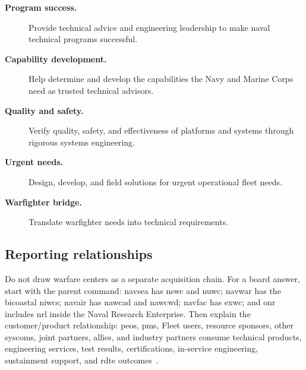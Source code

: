 \documentclass[../main.tex]{subfiles}
\begin{document}
\begin{description}
  \item[\textbf{Program success.}] Provide technical advice and engineering leadership to make naval technical programs successful.
  \item[\textbf{Capability development.}] Help determine and develop the capabilities the Navy and Marine Corps need as trusted technical advisors.
  \item[\textbf{Quality and safety.}] Verify quality, safety, and effectiveness of platforms and systems through rigorous systems engineering.
  \item[\textbf{Urgent needs.}] Design, develop, and field solutions for urgent operational fleet needs.
  \item[\textbf{Warfighter bridge.}] Translate warfighter needs into technical requirements.
\end{description}

\subsection{Reporting relationships}
Do not draw warfare centers as a separate acquisition chain. For a board answer,
start with the parent command: \ac{navsea} has \ac{nswc} and \ac{nuwc};
\ac{navwar} has the bicoastal \acp{niwc}; \ac{navair} has \ac{nawcad} and
\ac{nawcwd}; \ac{navfac} has \ac{exwc}; and \ac{onr} includes \ac{nrl} inside
the Naval Research Enterprise. Then explain the customer/product relationship:
\acp{peo}, \acp{pm}, Fleet users, resource sponsors, other \acp{syscom},
joint partners, allies, and industry partners consume technical products,
engineering services, test results, certifications, in-service engineering,
sustainment support, and \ac{rdte} outcomes~\autocite{edo-2-1-4-warfare-centers-2024,NAVSEA-Warfare-Centers-2026,NAVSEA-Field-Activities-2026,navwar-who-we-are-2026,NAVAIR-NAWCAD-2026,NAVAIR-NAWCWD-About-2026,NAVFAC-EXWC-Home-2026,ONR-Organization-2026}.
\end{document}
